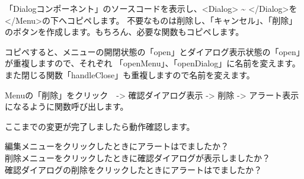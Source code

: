 「Dialogコンポーネント」のソースコードを表示し、\textless{}Dialog\textgreater{} \textasciitilde{} \textless{}/Dialog\textgreater{}を\textless{}/Menu\textgreater{}の下へコピペします。
不要なものは削除し、「キャンセル」、「削除」のボタンを作成します。もちろん、必要な関数もコピペします。

\vspace*{\baselineskip}

コピペすると、メニューの開閉状態の「open」とダイアログ表示状態の「open」が重複しますので、それぞれ
「openMenu」、「openDialog」に名前を変えます。また閉じる関数「handleClose」も重複しますので名前を変えます。

\vspace*{\baselineskip}

Menuの「削除」をクリック　{-}\textgreater{} 確認ダイアログ表示 {-}\textgreater{} 削除 {-}\textgreater{} アラート表示になるように関数呼び出します。

\vspace*{\baselineskip}

ここまでの変更が完了しましたら動作確認します。

編集メニューをクリックしたときにアラートはでましたか？\\[0pt]
削除メニューをクリックしたときに確認ダイアログが表示しましたか？\\[0pt]
確認ダイアログの削除をクリックしたときにアラートはでましたか？


\clearpage

